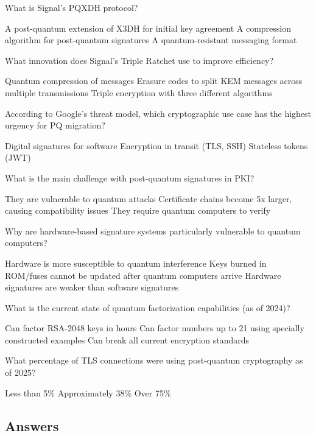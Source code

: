\documentclass[10pt,a4paper,american]{exam}
\begin{document}
\begin{questions}
	\question What is Signal's PQXDH protocol?
	\begin{randomizechoices}
		\CorrectChoice A post-quantum extension of X3DH for initial key agreement
		\choice A compression algorithm for post-quantum signatures
		\choice A quantum-resistant messaging format
	\end{randomizechoices}

	\question What innovation does Signal's Triple Ratchet use to improve efficiency?
	\begin{randomizechoices}
		\choice Quantum compression of messages
		\CorrectChoice Erasure codes to split KEM messages across multiple transmissions
		\choice Triple encryption with three different algorithms
	\end{randomizechoices}

	\question According to Google's threat model, which cryptographic use case has the highest urgency for PQ migration?
	\begin{randomizechoices}
		\choice Digital signatures for software
		\CorrectChoice Encryption in transit (TLS, SSH)
		\choice Stateless tokens (JWT)
	\end{randomizechoices}

	\question What is the main challenge with post-quantum signatures in PKI?
	\begin{randomizechoices}
		\choice They are vulnerable to quantum attacks
		\CorrectChoice Certificate chains become 5x larger, causing compatibility issues
		\choice They require quantum computers to verify
	\end{randomizechoices}

	\question Why are hardware-based signature systems particularly vulnerable to quantum computers?
	\begin{randomizechoices}
		\choice Hardware is more susceptible to quantum interference
		\CorrectChoice Keys burned in ROM/fuses cannot be updated after quantum computers arrive
		\choice Hardware signatures are weaker than software signatures
	\end{randomizechoices}

	\question What is the current state of quantum factorization capabilities (as of 2024)?
	\begin{randomizechoices}
		\choice Can factor RSA-2048 keys in hours
		\CorrectChoice Can factor numbers up to 21 using specially constructed examples
		\choice Can break all current encryption standards
	\end{randomizechoices}

	\question What percentage of TLS connections were using post-quantum cryptography as of 2025?
	\begin{randomizechoices}
		\choice Less than 5\%
		\CorrectChoice Approximately 38\%
		\choice Over 75\%
	\end{randomizechoices}

\end{questions}

\clearpage

\subsection*{Answers}
\printkeytable
\end{document}
